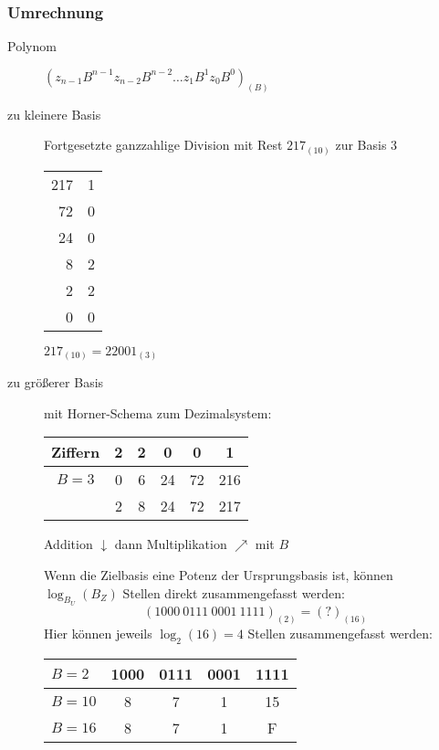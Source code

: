 \documentclass[12pt,a4paper]{article}
\begin{document}
\subsubsection{Umrechnung}
\begin{description}
	\item[Polynom] $(z_{n-1}B^{n-1}z_{n-2}B^{n-2} \dots z_1B^{1}z_0B^{0})_{(B)}$
	\item[zu kleinere Basis] Fortgesetzte ganzzahlige Division mit Rest
		$217_{(10)}$ zur Basis 3 \\
		\begin{tabular}{r c}
			217 & 1 \\
			72  & 0 \\
			24  & 0 \\
			8   & 2 \\
			2   & 2 \\
			0   & 0
		\end{tabular} $217_{(10)} = 22001_{(3)}$
	\item[zu größerer Basis] mit Horner-Schema zum Dezimalsystem:

		\begin{tabular}{|c||c|c|c|c|c|} \hline
			Ziffern & 2 & 2 & 0  & 0  & 1   \\ \hline \hline
			$B=3$   & 0 & 6 & 24 & 72 & 216 \\ \hline
			        & 2 & 8 & 24 & 72 & 217 \\ \hline
		\end{tabular} Addition $\downarrow$ dann Multiplikation $\nearrow$ mit $B$

		Wenn die Zielbasis eine Potenz der Ursprungsbasis ist, können $\log_{B_U}(B_Z)$ Stellen direkt zusammengefasst werden:
		$$(1000\ 0111\ 0001\ 1111)_{(2)}=(?)_{(16)}$$
		Hier können jeweils $\log_2(16)=4$ Stellen zusammengefasst werden:

		\begin{tabular}[t]{|l||c|c|c|c|} \hline
			$B = 2$  & 1000 & 0111 & 0001 & 1111 \\ \hline
			$B = 10$ & 8    & 7    & 1    & 15   \\ \hline
			$B = 16$ & 8    & 7    & 1    & F    \\ \hline
		\end{tabular}
\end{description}
\end{document}
